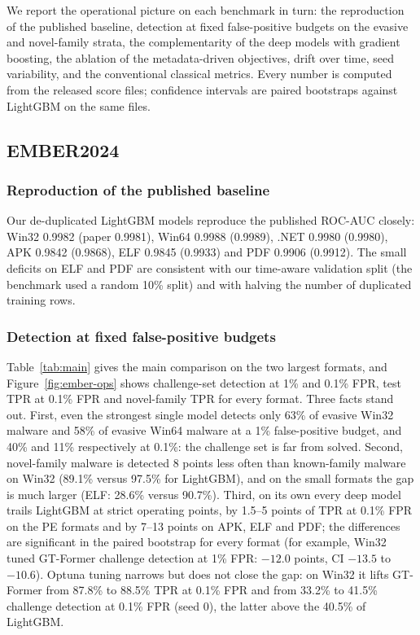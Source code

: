 \documentclass[fleqn,10pt]{wlscirep}
\newcommand{\gtf}{GT\mbox{-}Former}
\newcommand{\lgbm}{LightGBM}
\begin{document}
We report the operational picture on each benchmark in turn: the reproduction of the published baseline, detection at fixed false-positive budgets on the evasive and novel-family strata, the complementarity of the deep models with gradient boosting, the ablation of the metadata-driven objectives, drift over time, seed variability, and the conventional classical metrics. Every number is computed from the released score files; confidence intervals are paired bootstraps against \lgbm{} on the same files.

\subsection{EMBER2024}
\label{sec:ember}

\subsubsection{Reproduction of the published baseline}
\label{sec:repro}
Our de-duplicated \lgbm{} models reproduce the published ROC-AUC closely: Win32 0.9982 (paper 0.9981), Win64 0.9988 (0.9989), .NET 0.9980 (0.9980), APK 0.9842 (0.9868), ELF 0.9845 (0.9933) and PDF 0.9906 (0.9912). The small deficits on ELF and PDF are consistent with our time-aware validation split (the benchmark used a random 10\% split) and with halving the number of duplicated training rows.

\subsubsection{Detection at fixed false-positive budgets}
\label{sec:ops}
Table~\ref{tab:main} gives the main comparison on the two largest formats, and Figure~\ref{fig:ember-ops} shows challenge-set detection at 1\% and 0.1\% FPR, test TPR at 0.1\% FPR and novel-family TPR for every format. Three facts stand out. First, even the strongest single model detects only 63\% of evasive Win32 malware and 58\% of evasive Win64 malware at a 1\% false-positive budget, and 40\% and 11\% respectively at 0.1\%: the challenge set is far from solved. Second, novel-family malware is detected 8 points less often than known-family malware on Win32 (89.1\% versus 97.5\% for \lgbm{}), and on the small formats the gap is much larger (ELF: 28.6\% versus 90.7\%). Third, on its own every deep model trails \lgbm{} at strict operating points, by 1.5--5 points of TPR at 0.1\% FPR on the PE formats and by 7--13 points on APK, ELF and PDF; the differences are significant in the paired bootstrap for every format (for example, Win32 tuned \gtf{} challenge detection at 1\% FPR: $-12.0$ points, CI $-13.5$ to $-10.6$). Optuna tuning narrows but does not close the gap: on Win32 it lifts \gtf{} from 87.8\% to 88.5\% TPR at 0.1\% FPR and from 33.2\% to 41.5\% challenge detection at 0.1\% FPR (seed 0), the latter above the 40.5\% of \lgbm{}.
\end{document}
